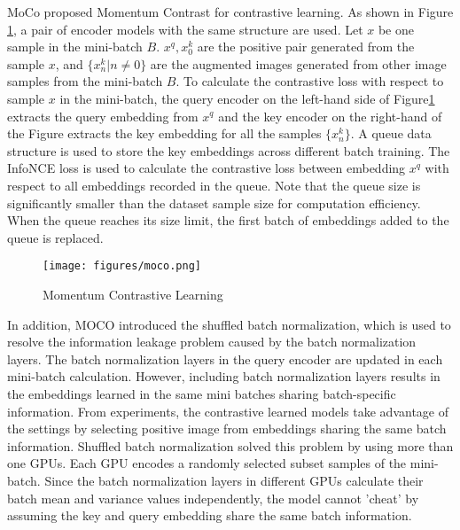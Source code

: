 \documentclass[12pt,twoside]{report}
\begin{document}
MoCo\cite{moco} proposed Momentum Contrast for contrastive learning. As shown in Figure \ref{fig:moco}, a pair of encoder models with the same structure are used. Let $x$ be one sample in the mini-batch $B$. $x^q, x_0^k$ are the positive pair generated from the sample $x$, and $\{x_n^k | n \neq 0\}$ are the augmented images generated from other image samples from the mini-batch $B$. To calculate the contrastive loss with respect to sample $x$ in the mini-batch, the query encoder on the left-hand side of Figure\ref{fig:moco} extracts the query embedding from $x^q$ and the key encoder on the right-hand of the Figure extracts the key embedding for all the samples $\{x_n^k\}$. A queue data structure is used to store the key embeddings across different batch training. The InfoNCE loss is used to calculate the contrastive loss between embedding $x^q$ with respect to all embeddings recorded in the queue. Note that the queue size is significantly smaller than the dataset sample size for computation efficiency. When the queue reaches its size limit, the first batch of embeddings added to the queue is replaced. \\

\begin{figure}
  \centering
  \texttt{[image: figures/moco.png]}
  \caption{Momentum Contrastive Learning \cite{moco}}
  \label{fig:moco}
\end{figure}


In addition, MOCO \cite{moco} introduced the shuffled batch normalization, which is used to resolve the information leakage problem caused by the batch normalization layers. The batch normalization layers in the query encoder are updated in each mini-batch calculation. However, including batch normalization layers results in the embeddings learned in the same mini batches sharing batch-specific information. From experiments, the contrastive learned models take advantage of the settings by selecting positive image from embeddings sharing the same batch information. Shuffled batch normalization solved this problem by using more than one GPUs. Each GPU encodes a randomly selected subset samples of the mini-batch. Since the batch normalization layers in different GPUs calculate their batch mean and variance values independently, the model cannot 'cheat' by assuming the key and query embedding share the same batch information. \\
\end{document}
